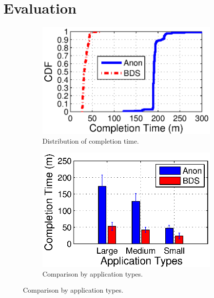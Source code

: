 \section{Evaluation}
\label{sec:evaluation}
\begin{figure}[t]
        \centering
        \begin{subfigure}[b]{0.3\textwidth}
                \centering
                \includegraphics[width=\textwidth]{images/BDSvsAnon_overall.eps}
                \caption{Distribution of completion time.}
                \label{fig:BDSvsAnon:overall}
        \end{subfigure}
        \begin{subfigure}[b]{0.3\textwidth}%
                \centering
                \includegraphics[width=\textwidth]{images/BDS_VS_ANON_v3.eps}
                \caption{Comparison by application types.}

\end{subfigure}
\end{figure}
